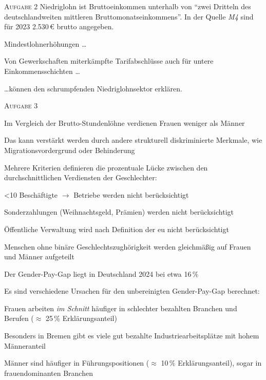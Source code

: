 \textsc{Aufgabe 2} \quad
Niedriglohn ist Bruttoeinkommen unterhalb von \enquote{zwei Dritteln des deutschlandweiten mittleren Bruttomonatseinkommens}.
In der Quelle \emph{M4} sind für 2023 2.530\,€ brutto angegeben. 

\begin{myitemize}
    \item Mindestlohnerhöhungen \dots
    \item Von Gewerkschaften miterkämpfte Tarifabschlüsse auch für untere Einkommensschichten \dots
\end{myitemize}
\dots können den schrumpfenden Niedriglohnsektor erklären. 
\bigskip

\textsc{Aufgabe 3} \quad
\begin{myitemize}
    \item Im Vergleich der Brutto-Stundenlöhne verdienen Frauen weniger als Männer
    \item Das kann verstärkt werden durch andere strukturell diskriminierte Merkmale, wie Migrationsvordergrund oder Behinderung 
    \item Mehrere Kriterien definieren die prozentuale Lücke zwischen den durchschnittlichen Verdiensten der Geschlechter:
    \begin{myitemize}
        \item <10 Beschäftigte $\rightarrow$ Betriebe werden nicht berücksichtigt
        \item Sonderzahlungen (Weihnachtsgeld, Prämien) werden nicht berücksichtigt
        \item Öffentliche Verwaltung wird nach Definition der \gls{eu} nicht berücksichtigt
        \item Menschen ohne binäre Geschlechtszughörigkeit werden gleichmäßig auf Frauen und Männer aufgeteilt
    \end{myitemize}
    \item Der Gender-Pay-Gap liegt in Deutschland 2024 bei etwa 16\,\%
    \item Es sind verschiedene Ursachen für den unbereinigten Gender-Pay-Gap berechnet:
    \begin{myitemize}
        \item Frauen arbeiten \emph{im Schnitt} häufiger in schlechter bezahlten Branchen und Berufen ($\approx$ 25\,\% Erklärungsanteil)
        \item Besonders in Bremen gibt es viele gut bezahlte Industriearbeitsplätze mit hohem Männeranteil
        \item Männer sind häufiger in Führungspositionen ($\approx$ 10\,\% Erklärungsanteil), sogar in frauendominanten Branchen

\end{myitemize}
\end{myitemize}
